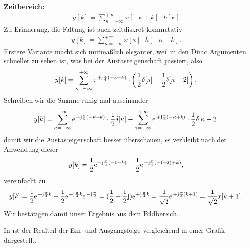 \begin{ExCalc}
\textbf{Zeitbereich:}
\begin{align}
y[k] = \sum_{\kappa=-\infty}^{+\infty} x[-\kappa + k] \cdot h[\kappa]
\end{align}
Zu Erinnerung, die Faltung ist auch zeitdiskret kommutativ:
\begin{align}
y[k] = \sum_{\kappa=-\infty}^{+\infty} x[\kappa] \cdot h[-\kappa + k].
\end{align}
Erstere Variante macht sich mutmaßlich eleganter, weil in den Dirac Argumenten
schneller zu sehen ist, was bei der Austasteigenschaft passiert, also
%
\begin{align}
y[k] = \sum_{\kappa=-\infty}^{+\infty} \e^{+\im\frac{\pi}{4} (-\kappa+k)} \cdot
\left(\frac{1}{2}\delta[\kappa] - \frac{1}{2}\delta[\kappa-2]\right).
\end{align}
%
Schreiben wir die Summe ruhig mal auseinander
\begin{align}
y[k] =
\sum_{\kappa=-\infty}^{+\infty} \e^{+\im\frac{\pi}{4} (-\kappa+k)} \cdot \frac{1}{2}\delta[\kappa]
-
\sum_{\kappa=-\infty}^{+\infty} \e^{+\im\frac{\pi}{4} (-\kappa+k)} \cdot \frac{1}{2}\delta[\kappa-2]
\end{align}
damit wir die Austasteigenschaft besser überschauen, es verbleibt nach der Anwendung dieser
\begin{align}
y[k] =
\frac{1}{2} \e^{+\im\frac{\pi}{4} (-0+k)}
-
\frac{1}{2} \e^{+\im\frac{\pi}{4} (-(+2)+k)},
\end{align}
vereinfacht zu
\begin{align}
y[k] =
\frac{1}{2} \e^{+\im\frac{\pi}{4} k}
-
\frac{1}{2} \e^{+\im\frac{\pi}{4} k} \e^{-\im\frac{\pi}{2}} =
(\frac{1}{2} + \frac{1}{2} \im )\e^{+\im\frac{\pi}{4} k}
=
\frac{1}{\sqrt{2}} \e^{+\im \frac{\pi}{4} (k+1)}=
\frac{1}{\sqrt{2}} x[k+1].
\end{align}
Wir bestätigen damit unser Ergebnis aus dem Bildbereich.

In  ist der Realteil der Ein- und Ausgangsfolge vergleichend
in einer Grafik dargestellt.
\end{ExCalc}
